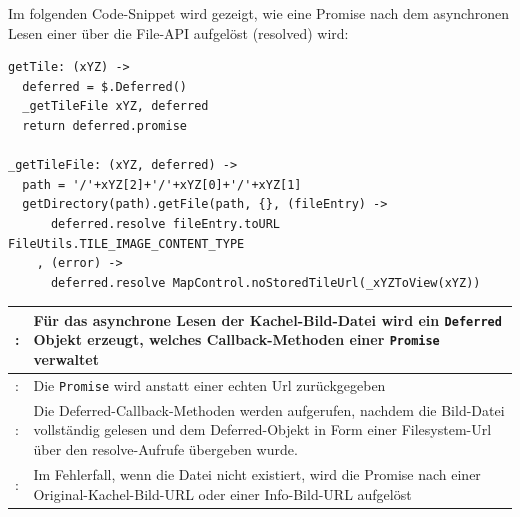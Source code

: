 Im folgenden Code-Snippet wird gezeigt, wie eine Promise nach dem asynchronen Lesen einer über die File-API
aufgelöst (resolved) wird:
\lstset{language=CoffeeScript}
\begin{lstlisting}[frame=single,xleftmargin=0pt]
getTile: (xYZ) ->
  deferred = $.Deferred()
  _getTileFile xYZ, deferred
  return deferred.promise  

_getTileFile: (xYZ, deferred) ->
  path = '/'+xYZ[2]+'/'+xYZ[0]+'/'+xYZ[1]
  getDirectory(path).getFile(path, {}, (fileEntry) ->
  	  deferred.resolve fileEntry.toURL FileUtils.TILE_IMAGE_CONTENT_TYPE
  	, (error) ->
  	  deferred.resolve MapControl.noStoredTileUrl(_xYZToView(xYZ))
\end{lstlisting}
\begin{table}[H]
  \begin{tabulary}{\columnwidth}{>{\raggedleft}m{.5cm} L}
  : & Für das asynchrone Lesen der Kachel-Bild-Datei wird ein \texttt{Deferred} Objekt erzeugt, welches Callback-Methoden einer \texttt{Promise} verwaltet \\ : & Die \texttt{Promise} wird anstatt einer echten Url zurückgegeben  \\ : & Die Deferred-Callback-Methoden werden aufgerufen, nachdem die Bild-Datei vollständig gelesen und dem Deferred-Objekt in Form einer Filesystem-Url über den resolve-Aufrufe übergeben wurde.\\ : & Im Fehlerfall, wenn die Datei nicht existiert, wird die Promise nach einer Original-Kachel-Bild-URL oder einer Info-Bild-URL aufgelöst \\ \hline
  \end{tabulary}
\end{table}
